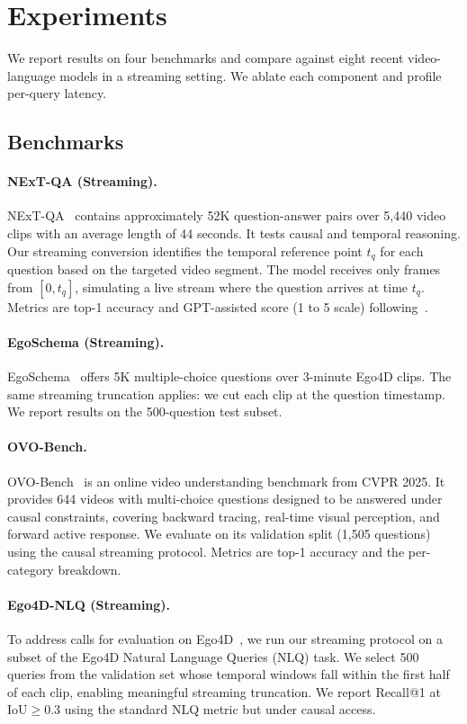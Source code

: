 \section{Experiments}
\label{sec:experiments}

We report results on four benchmarks and compare against eight recent video-language models in a streaming setting. We ablate each \ours component and profile per-query latency.

\subsection{Benchmarks}
\label{sec:benchmarks}

\paragraph{NExT-QA (Streaming).}
NExT-QA~\cite{xiao2021nextqa} contains approximately 52K question-answer pairs over 5,440 video clips with an average length of 44 seconds. It tests causal and temporal reasoning.
Our streaming conversion identifies the temporal reference point $t_q$ for each question based on the targeted video segment. The model receives only frames from $[0, t_q]$, simulating a live stream where the question arrives at time $t_q$.
Metrics are top-1 accuracy and GPT-assisted score (1 to 5 scale) following~\cite{maaz2023videochatgpt}.

\paragraph{EgoSchema (Streaming).}
EgoSchema~\cite{mangalam2023egoschema} offers 5K multiple-choice questions over 3-minute Ego4D clips.
The same streaming truncation applies: we cut each clip at the question timestamp. We report results on the 500-question test subset.

\paragraph{OVO-Bench.}
OVO-Bench~\cite{li2025ovobench} is an online video understanding benchmark from CVPR 2025. It provides 644 videos with multi-choice questions designed to be answered under causal constraints, covering backward tracing, real-time visual perception, and forward active response.
We evaluate on its validation split (1,505 questions) using the causal streaming protocol.
Metrics are top-1 accuracy and the per-category breakdown.

\paragraph{Ego4D-NLQ (Streaming).}
To address calls for evaluation on Ego4D~\cite{grauman2022ego4d}, we run our streaming protocol on a subset of the Ego4D Natural Language Queries (NLQ) task. We select 500 queries from the validation set whose temporal windows fall within the first half of each clip, enabling meaningful streaming truncation. We report Recall@1 at IoU$\ge$0.3 using the standard NLQ metric but under causal access.

